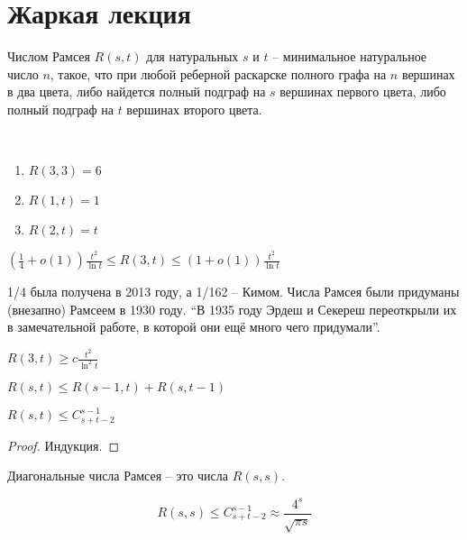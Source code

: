 \documentclass[document.tex]{subfiles}
\begin{document}
\section{Жаркая лекция}
\begin{definition}
	Числом Рамсея $R(s, t)$ для натуральных $s$ и $t$ -- минимальное натуральное число $n$, такое, что при любой реберной раскарске полного графа на $n$ вершинах в два цвета, либо найдется полный подграф на $s$ вершинах первого цвета, либо полный подграф на $t$ вершинах второго цвета.
\end{definition}
\begin{example}
	~\begin{enumerate}
		\item $R(3, 3) = 6$
		\item $R(1, t) = 1$
		\item $R(2, t) = t$
	\end{enumerate}
\end{example}

\begin{statement}
	$(\frac{1}{4} + o(1))\frac{t^2}{\ln t} \leq R(3, t) \leq (1 + o(1))\frac{t^2}{\ln t}$
\end{statement}

\begin{remark}
	1/4 была получена в 2013 году, а 1/162 -- Кимом. Числа Рамсея были придуманы (внезапно) Рамсеем в 1930 году. ``В 1935 году Эрдеш и Секереш переоткрыли их в замечательной работе, в которой они ещё много чего придумали''.
\end{remark}

\begin{statement}
	$R(3, t) \geq c \frac{t^2}{\ln^2 t}$
\end{statement}

\begin{theorem}
	$R(s, t) \leq R(s-1, t) + R(s, t-1)$
\end{theorem}

\begin{corollary}
	$R(s, t) \leq C_{s+t-2}^{s-1}$
\end{corollary}

\begin{proof}
	Индукция.
\end{proof}

\begin{definition}
	Диагональные числа Рамсея -- это числа $R(s, s)$.
\end{definition}

\begin{corollary}[из следствия]
	$$R(s, s) \leq C_{s+t-2}^{s-1} \approx \frac{4^s}{\sqrt{\pi s}}$$
\end{corollary}
\end{document}
